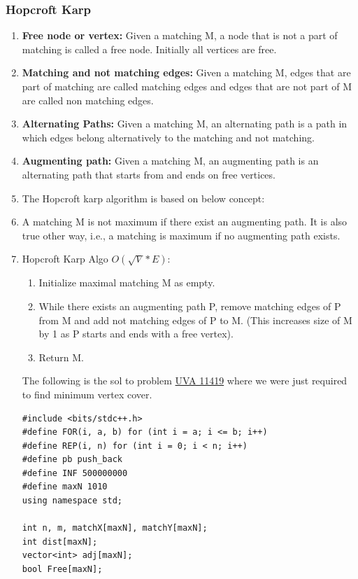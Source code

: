 \documentclass[8pt, a4paper, oneside, twocolumn]{extarticle}
\begin{document}
\subsubsection{Hopcroft Karp}
\begin{enumerate}
    \item \textbf{Free node or vertex: }Given a matching M, a node that is not a part of matching is called a free node. Initially all vertices are free.
    \item \textbf{Matching and not matching edges: }Given a matching M, edges that are part of matching are called matching edges and edges that are not part of M are called non matching edges.
    \item \textbf{Alternating Paths: }Given a matching M, an alternating path is a path in which edges belong alternatively to the matching and not matching.
    \item \textbf{Augmenting path: }Given a matching M, an augmenting path is an alternating path that starts from and ends on free vertices.
    \item The Hopcroft karp algorithm is based on below concept:
    \item A matching M is not maximum if there exist an augmenting path. It is also true other way, i.e., a matching is maximum if no augmenting path exists.
    \item Hopcroft Karp Algo $O(\sqrt{V}*E)$: 
    \begin{enumerate}
        \item Initialize maximal matching M as empty.
        \item While there exists an augmenting path P, remove matching edges of P from M and add not matching edges of P to M. (This increases size of M by 1 as P starts and ends with a free vertex).
        \item Return M.
    \end{enumerate}
The following is the sol to problem \href {https://uva.onlinejudge.org/external/114/11419.pdf}{UVA 11419} where we were just required to find minimum vertex cover.
    \begin{verbatim}
#include <bits/stdc++.h>
#define FOR(i, a, b) for (int i = a; i <= b; i++)
#define REP(i, n) for (int i = 0; i < n; i++)
#define pb push_back
#define INF 500000000
#define maxN 1010
using namespace std;

int n, m, matchX[maxN], matchY[maxN];
int dist[maxN];
vector<int> adj[maxN];
bool Free[maxN];


\end{verbatim}
\end{enumerate}
\end{document}
